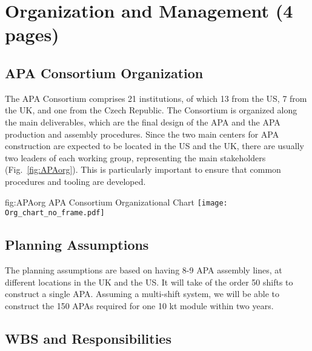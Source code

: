 \section{Organization and Management (4 pages)}
\label{sec:fdsp-apa-org}


\subsection{APA Consortium Organization}
\label{sec:fdsp-apa-org-consortium}
The APA Consortium comprises 21 institutions, of which 13 from the US, 7 from the UK, and one from the Czech Republic. The Consortium is organized along the main deliverables, which are the final design of the APA and the APA production and assembly procedures. Since the two main centers for APA construction are expected to be located in the US and the UK, there are usually two leaders of each working group, representing the main stakeholders (Fig.~\ref{fig:APAorg}). This is particularly important to ensure that common procedures and tooling are developed. 


\begin{dunefigure}{fig:APAorg}
{APA Consortium Organizational Chart}
\texttt{[image: Org\_chart\_no\_frame.pdf]}
\end{dunefigure}


\subsection{Planning Assumptions}
\label{sec:fdsp-apa-org-assmp}
The planning assumptions are based on having 8-9 APA assembly lines, at different locations in the UK and the US. It will take of the order 50 shifts to construct a single APA. Assuming a multi-shift system, we will be able to construct the 150 APAs required for one 10 kt module within two years.


\subsection{WBS and Responsibilities}
\label{sec:fdsp-apa-org-wbs}


